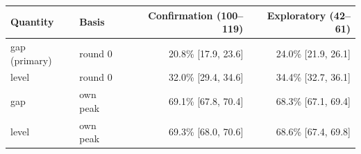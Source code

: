 \small
\begin{tabular}{llrr}
\hline
Quantity & Basis & Confirmation (100--119) & Exploratory (42--61) \\
\hline
gap (primary) & round 0 & 20.8\% [17.9, 23.6] & 24.0\% [21.9, 26.1] \\
level & round 0 & 32.0\% [29.4, 34.6] & 34.4\% [32.7, 36.1] \\
gap & own peak & 69.1\% [67.8, 70.4] & 68.3\% [67.1, 69.4] \\
level & own peak & 69.3\% [68.0, 70.6] & 68.6\% [67.4, 69.8] \\
\hline
\end{tabular}

